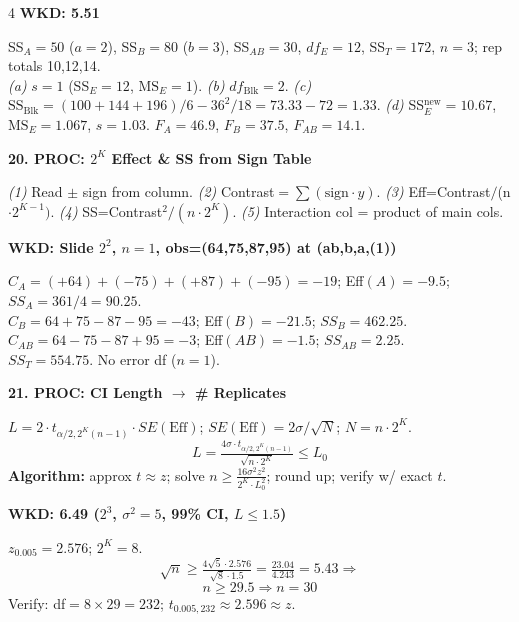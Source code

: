 \documentclass[7pt,letterpaper,landscape]{extarticle}
\newcommand{\secbar}[1]{%
  \vspace{2pt}%
  {\colorbox{black!80}{\parbox{\dimexpr\linewidth-2\fboxsep}{\color{white}\small\bfseries #1}}}\par%
  \vspace{1pt}%
}
\newcommand{\subsec}[1]{\vspace{1pt}\textbf{\small #1}\par}
\newcommand{\MSE}{\mathrm{MS}_E}
\newcommand{\SSB}{\mathrm{SS}_{\text{Blk}}}
\begin{document}
\begin{multicols*}{4}
\subsec{WKD: 5.51}
SS$_A{=}50$ ($a{=}2$), SS$_B{=}80$ ($b{=}3$), SS$_{AB}{=}30$, $df_E{=}12$, SS$_T{=}172$, $n{=}3$; rep totals 10,12,14.\\
\textit{(a)} $s{=}1$ (SS$_E{=}12$, $\MSE{=}1$). \textit{(b)} $df_{\text{Blk}}{=}2$. \textit{(c)} $\SSB{=}(100{+}144{+}196)/6{-}36^2/18{=}73.33{-}72{=}1.33$. \textit{(d)} SS$_E^{\text{new}}{=}10.67$, $\MSE{=}1.067$, $s{=}1.03$. $F_A{=}46.9$, $F_B{=}37.5$, $F_{AB}{=}14.1$.

\secbar{20. PROC: $2^K$ Effect \& SS from Sign Table}
\textit{(1)} Read $\pm$ sign from column. \textit{(2)} Contrast$=\sum(\text{sign}\cdot y)$. \textit{(3)} Eff=Contrast$/$(n$\cdot2^{K-1})$. \textit{(4)} SS=Contrast$^2/(n\cdot2^K)$. \textit{(5)} Interaction col = product of main cols.

\subsec{WKD: Slide $2^2$, $n{=}1$, obs=(64,75,87,95) at (ab,b,a,(1))}
$C_A{=}(+64){+}(-75){+}(+87){+}(-95){=}-19$; Eff$(A){=}-9.5$; $SS_A{=}361/4{=}90.25$.\\
$C_B{=}64{+}75{-}87{-}95{=}-43$; Eff$(B){=}-21.5$; $SS_B{=}462.25$.\\
$C_{AB}{=}64{-}75{-}87{+}95{=}-3$; Eff$(AB){=}-1.5$; $SS_{AB}{=}2.25$.\\
$SS_T{=}554.75$. No error df ($n{=}1$).

\secbar{21. PROC: CI Length $\to$ \# Replicates}
$L{=}2\cdot t_{\alpha/2,2^K(n-1)}\cdot SE(\text{Eff})$; $SE(\text{Eff}){=}2\sigma/\sqrt{N}$; $N{=}n\cdot2^K$.
\[L{=}\tfrac{4\sigma\cdot t_{\alpha/2,2^K(n-1)}}{\sqrt{n\cdot 2^K}}\le L_0\]
\textbf{Algorithm:} approx $t\approx z$; solve $n\ge\tfrac{16\sigma^2 z^2}{2^K\cdot L_0^2}$; round up; verify w/ exact $t$.

\subsec{WKD: 6.49 ($2^3$, $\sigma^2{=}5$, 99\% CI, $L{\le}1.5$)}
$z_{0.005}{=}2.576$; $2^K{=}8$.
\[\sqrt n\ge\tfrac{4\sqrt5\cdot 2.576}{\sqrt 8\cdot 1.5}{=}\tfrac{23.04}{4.243}{=}5.43\Rightarrow\] \[n{\ge}29.5\Rightarrow\boxed{n{=}30}\]
Verify: df$=8\times29{=}232$; $t_{0.005,232}{\approx}2.596\approx z$. \checkmark


\end{multicols*}
\end{document}
